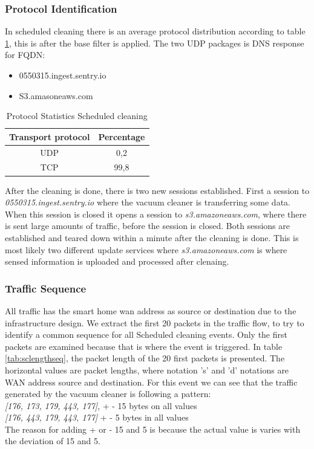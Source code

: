 \subsubsection{Protocol Identification}
In scheduled cleaning there is an average protocol distribution according to table \ref{tab:scanalysisdist}, this is after the base filter is applied. The two UDP packages is DNS response for FQDN:

\begin{itemize}
    \item 0550315.ingest.sentry.io
    \item S3.amasoneaws.com
\end{itemize}

\begin{table}[H]
\centering
\caption{Protocol Statistics Scheduled cleaning}
\label{tab:scanalysisdist}
\begin{tabular}{|c|c|}
\hline
\textbf{Transport protocol} & \textbf{Percentage} \\ \hline
UDP                         & 0,2                 \\ \hline
TCP                         & 99,8                \\ \hline
\end{tabular}
\end{table}

After the cleaning is done, there is two new sessions established. First a session to \textit{0550315.ingest.sentry.io} where the vacuum cleaner is transferring some data. When this session is closed it opens a session to \textit{s3.amazoneaws.com}, where there is sent large amounts of traffic, before the session is closed. Both sessions are established and teared down within a minute after the cleaning is done. This is most likely two different update services where \textit{s3.amazoneaws.com} is where sensed information is uploaded and processed after clenaing.
 
\subsubsection{Traffic Sequence}
All traffic has the smart home wan address as source or destination due to the infrastructure design. We extract the first 20  packets in the traffic flow, to try to identify a common sequence for all Scheduled cleaning events. Only the first packets are examined because that is where the event is triggered. In table \ref{tab:sclengthseq}, the packet length of the 20 first packets is presented. The horizontal values are packet lengths, where notation 's' and 'd' notations are WAN address source and destination.  
For this event we can see that the traffic generated by the vacuum cleaner is following a pattern: 
\\
\textit{[176, 173, 179, 443, 177]}, + - 15 bytes on all values 
\\
\textit{[176, 443, 179, 443, 177]} + - 5 bytes in all values
\\
The reason for adding + or - 15 and 5 is because the actual value is varies with the deviation of 15 and 5.

